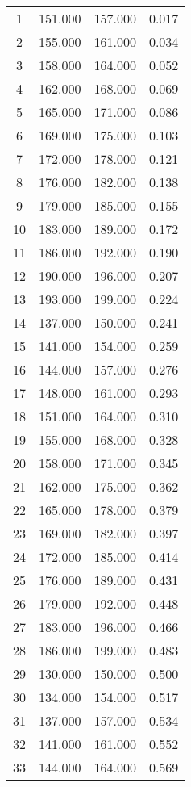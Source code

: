 % 
\begin{tabular}{cccc}
  \hline
  \hline
1 & 151.000 & 157.000 & 0.017 \\ 
  2 & 155.000 & 161.000 & 0.034 \\ 
  3 & 158.000 & 164.000 & 0.052 \\ 
  4 & 162.000 & 168.000 & 0.069 \\ 
  5 & 165.000 & 171.000 & 0.086 \\ 
  6 & 169.000 & 175.000 & 0.103 \\ 
  7 & 172.000 & 178.000 & 0.121 \\ 
  8 & 176.000 & 182.000 & 0.138 \\ 
  9 & 179.000 & 185.000 & 0.155 \\ 
  10 & 183.000 & 189.000 & 0.172 \\ 
  11 & 186.000 & 192.000 & 0.190 \\ 
  12 & 190.000 & 196.000 & 0.207 \\ 
  13 & 193.000 & 199.000 & 0.224 \\ 
  14 & 137.000 & 150.000 & 0.241 \\ 
  15 & 141.000 & 154.000 & 0.259 \\ 
  16 & 144.000 & 157.000 & 0.276 \\ 
  17 & 148.000 & 161.000 & 0.293 \\ 
  18 & 151.000 & 164.000 & 0.310 \\ 
  19 & 155.000 & 168.000 & 0.328 \\ 
  20 & 158.000 & 171.000 & 0.345 \\ 
  21 & 162.000 & 175.000 & 0.362 \\ 
  22 & 165.000 & 178.000 & 0.379 \\ 
  23 & 169.000 & 182.000 & 0.397 \\ 
  24 & 172.000 & 185.000 & 0.414 \\ 
  25 & 176.000 & 189.000 & 0.431 \\ 
  26 & 179.000 & 192.000 & 0.448 \\ 
  27 & 183.000 & 196.000 & 0.466 \\ 
  28 & 186.000 & 199.000 & 0.483 \\ 
  29 & 130.000 & 150.000 & 0.500 \\ 
  30 & 134.000 & 154.000 & 0.517 \\ 
  31 & 137.000 & 157.000 & 0.534 \\ 
  32 & 141.000 & 161.000 & 0.552 \\ 
  33 & 144.000 & 164.000 & 0.569 \\ 

\end{tabular}
